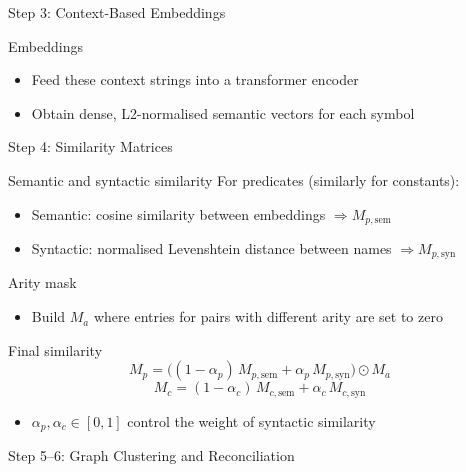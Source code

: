 \documentclass[presentation]{beamer}
\begin{document}
{\begin{frame}{Step 3: Context-Based Embeddings}
\begin{block}{Embeddings}
\begin{itemize}
    \item Feed these context strings into a transformer encoder
    \item Obtain dense, L2-normalised semantic vectors for each symbol
\end{itemize}
\end{block}

\end{frame}

\begin{frame}{Step 4: Similarity Matrices}

\begin{block}{Semantic and syntactic similarity}
For predicates (similarly for constants):
\begin{itemize}
    \item Semantic: cosine similarity between embeddings
          $\Rightarrow M_{p,\text{sem}}$
    \item Syntactic: normalised Levenshtein distance between names
          $\Rightarrow M_{p,\text{syn}}$
\end{itemize}
\end{block}

\begin{block}{Arity mask}
\begin{itemize}
    \item Build $M_a$ where entries for pairs with different arity are set to zero
\end{itemize}
\end{block}

\begin{block}{Final similarity}
\[
M_p = \big((1 - \alpha_p)\, M_{p,\text{sem}} + \alpha_p\, M_{p,\text{syn}}\big) \odot M_a
\]
\[
M_c = (1 - \alpha_c)\, M_{c,\text{sem}} + \alpha_c\, M_{c,\text{syn}}
\]
\begin{itemize}
    \item $\alpha_p, \alpha_c \in [0,1]$ control the weight of syntactic similarity
\end{itemize}
\end{block}

\end{frame}

\begin{frame}{Step 5–6: Graph Clustering and Reconciliation}


\end{frame}}
\end{document}
